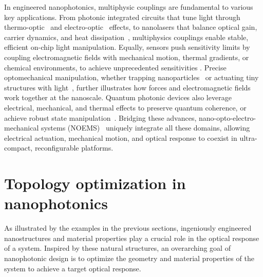 In engineered nanophotonics, multiphysic couplings are fundamental to various key applications. From photonic integrated circuits that tune light through  
thermo-optic~\cite{TOPS_1, TOPS_2, TOPS_3, program, PIC} and electro-optic~\cite{modu, modu1, modu2, pockels} effects, to nanolasers that balance optical gain, carrier dynamics, and heat dissipation~\cite{laser,laser_pic}, multiphysics couplings enable stable, efficient on-chip light manipulation. Equally, sensors  
push sensitivity limits by coupling electromagnetic fields with mechanical motion, thermal gradients, or chemical environments, to achieve unprecedented sensitivities \cite{therm_sensing,sensing, weakforce}.
Precise optomechanical manipulation, whether trapping nanoparticles~\cite{ashkin_acceleration_1970} or actuating tiny structures with light~\cite{ivanyi_optically_2024}, further illustrates how forces and electromagnetic fields work together at the nanoscale. Quantum photonic devices 
also leverage electrical, mechanical, and thermal effects to preserve quantum coherence, or achieve robust state manipulation~\cite{quant_eo, Andrews_2014, Xi_2025}. Bridging these advances, nano-opto-electro-mechanical systems (NOEMS)~\cite{NOEMS} uniquely integrate all these  
domains, allowing electrical actuation, mechanical motion, and optical response to coexist in ultra-compact, reconfigurable platforms. 



\section{Topology optimization in nanophotonics}\label{intro:to}

As illustrated by the examples in the previous sections, ingeniously engineered nanostructures and material properties play a crucial role in the
optical response of a system. Inspired by these natural structures, an overarching goal of nanophotonic
design is to optimize the geometry and material properties of the system to achieve a target
optical response.

